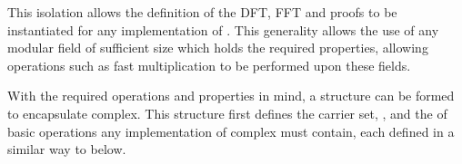 This isolation allows the definition of the DFT, FFT and proofs to be instantiated
for any implementation of .
This generality allows the use of any modular field of 
sufficient size which holds the required properties, allowing operations such as 
fast multiplication to be performed upon these fields.

With the required operations and properties in mind, a structure can
be formed to encapsulate complex.
This structure first defines the carrier set, , and the of basic operations
any implementation of complex must contain, each defined in a similar way to \AF{\_+\_} below.

